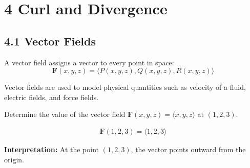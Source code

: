 \section*{4 Curl and Divergence}

\subsection*{4.1 Vector Fields}

\begin{conceptbox}
    A vector field assigns a vector to every point in space:
    \begin{equation*}
        \mathbf{F}(x,y,z) = \langle P(x,y,z), Q(x,y,z), R(x,y,z) \rangle
    \end{equation*}
\end{conceptbox}

Vector fields are used to model physical quantities such as velocity of a fluid, electric fields, and force fields.

\begin{examplebox}
    Determine the value of the vector field $\mathbf{F}(x,y,z)=\langle x, y, z \rangle$ at $(1,2,3)$.

    \begin{align*}
        \mathbf{F}(1,2,3) = \langle 1,2,3 \rangle
    \end{align*}

    \textbf{Interpretation:} At the point $(1,2,3)$, the vector points outward from the origin.
\end{examplebox}
